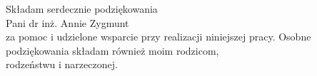 \clearpage
\vspace*{\fill}
\begin{center}
\begin{minipage}{.6\textwidth}
\begin{center}
Składam serdecznie podziękowania \\ Pani dr inż. Annie Zygmunt \\
za pomoc i udzielone wsparcie przy realizacji niniejszej pracy.
\vspace*{0.5cm} \vfill 	
Osobne podziękowania składam również moim rodzicom,\\
rodzeństwu i narzeczonej.
\end{center}
\end{minipage}
\end{center}
\vfill
\clearpage

